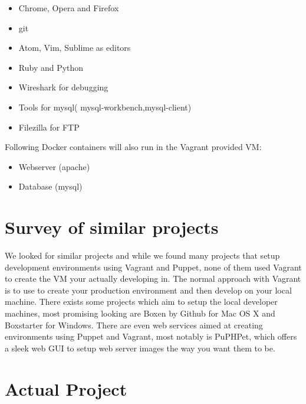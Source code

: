 \begin{itemize}
\item Chrome, Opera and Firefox
\item git
\item Atom, Vim, Sublime as editors
\item Ruby and Python
\item Wireshark for debugging
\item Tools for mysql( mysql-workbench,mysql-client)
\item Filezilla for FTP 
\end{itemize}
Following Docker containers will also run in the Vagrant provided \gls{VM}:
\begin{itemize}
\item Webserver (apache)
\item Database (mysql)
\end{itemize}

\section{Survey of similar projects}

We looked for similar projects and while we found many projects that setup development environments using Vagrant and Puppet, none of them used Vagrant to create the \gls{VM} your actually developing in. The normal approach with Vagrant is to use to create your production environment and then develop on your local machine. There exists some projects which aim to setup the local developer machines, most promising looking are Boxen by Github for Mac OS X and Boxstarter for Windows. 
There are even web services aimed at creating environments using Puppet and Vagrant, most notably is PuPHPet, which offers a sleek web GUI to setup web server images the way you want them to be.

\section{Actual Project}

